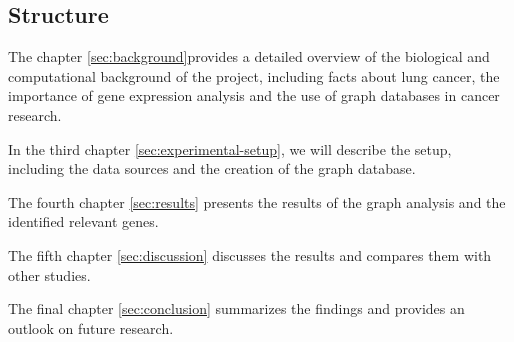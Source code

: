 \subsection{Structure}  \label{subsec:structure}

{\color{lightgray}

The chapter \ref{sec:background}provides a detailed overview of the biological and computational background of the project,
including facts about lung cancer, the importance of gene expression analysis and the use of graph databases in cancer research.

In the third chapter \ref{sec:experimental-setup}, we will describe the setup,
including the data sources and the creation of the graph database.

The fourth chapter \ref{sec:results} presents the results of the graph analysis and the identified relevant genes.

The fifth chapter \ref{sec:discussion} discusses the results and compares them with other studies.

The final chapter \ref{sec:conclusion} summarizes the findings and provides an outlook on future research.

}